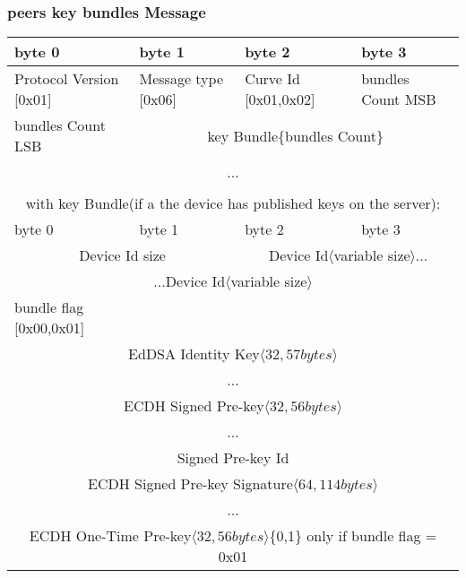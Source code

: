 \documentclass[a4paper,11pt]{article}
\begin{document}
    \subsubsection{peers key bundles Message}
      \begin{center}
      \begin{tabular}{ | p{1.4in} | p{1.4in} | p{1.4in} | p{1.4in} |}
        \hline
        \cellcolor[gray]{0.85} byte 0 & \cellcolor[gray]{0.85} byte 1 & \cellcolor[gray]{0.85} byte 2 & \cellcolor[gray]{0.85}byte 3\\
        \hline
        Protocol Version [0x01] & Message type [0x06] & Curve Id [0x01,0x02] & bundles Count MSB\\
        \hline
        bundles Count LSB & \multicolumn{3}{|c|}{key Bundle\{bundles Count\}}\\
        \cline{1-1}
        \multicolumn{4}{|c|}{...}\\
        \hline
        \multicolumn{4}{c}{}\\
        \multicolumn{4}{c}{with key Bundle(if a the device has published keys on the server):}\\
        \hline
        \cellcolor[gray]{0.95} byte 0 & \cellcolor[gray]{0.95} byte 1 & \cellcolor[gray]{0.95} byte 2 & \cellcolor[gray]{0.95}byte 3\\
        \hline
        \multicolumn{2}{|c|}{Device Id size}&\multicolumn{2}{|c|}{Device Id$\langle$variable size$\rangle$...}\\
        \hline
        \multicolumn{4}{|c|}{...Device Id$\langle$variable size$\rangle$}\\
        \hline
        bundle flag [0x00,0x01] & \multicolumn{3}{|c|}{}\\
        \cline{1-1}
        \multicolumn{4}{|c|}{EdDSA Identity Key$\langle 32,57bytes\rangle $}\\
        \multicolumn{4}{|c|}{...}\\
        \hline
        \multicolumn{4}{|c|}{ECDH Signed Pre-key$\langle 32,56bytes\rangle $}\\
        \multicolumn{4}{|c|}{...}\\
        \hline
        \multicolumn{4}{|c|}{Signed Pre-key Id}\\
        \hline
        \multicolumn{4}{|c|}{ECDH Signed Pre-key Signature$\langle 64,114bytes\rangle $}\\
        \multicolumn{4}{|c|}{...}\\
        \hline
        \multicolumn{4}{|c|}{ECDH One-Time Pre-key$\langle 32,56bytes\rangle $\{0,1\} only if bundle flag = 0x01}\\

\end{tabular}
\end{center}
\end{document}
